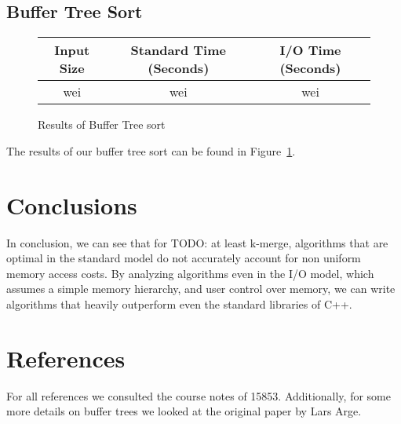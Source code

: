 \documentclass{article}
\begin{document}
\subsection{Buffer Tree Sort}

\begin{figure}
  \centering
  \begin{tabular}{|c|c|c|}
    \hline
    Input Size & Standard Time (Seconds) & I/O Time (Seconds)\\
    \hline
    \hline
    wei & wei & wei \\
    \hline
  \end{tabular}
  \caption{Results of Buffer Tree sort}
  \label{buffer-tree-res}
\end{figure}

The results of our buffer tree sort can be found in Figure~\ref{buffer-tree-res}.



\section{Conclusions}

In conclusion, we can see that for TODO: at least k-merge,
algorithms that are optimal in the standard model do not accurately
account for non uniform memory access costs.
%
By analyzing algorithms even in the I/O model, which assumes
a simple memory hierarchy, and user control over memory,
we can write algorithms that heavily outperform
even the standard libraries of C++.

\section{References}

For all references we consulted the course notes of 15853.
%
Additionally, for some more details on buffer trees we looked at the
original paper by Lars Arge.
\end{document}
